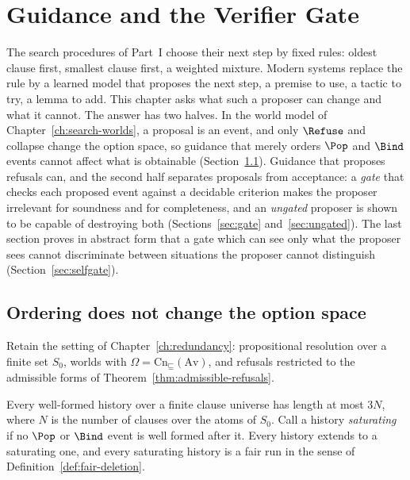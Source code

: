 \chapter{Guidance and the Verifier Gate}
\label{ch:guidance}

The search procedures of Part~I choose their next step by fixed rules: oldest clause first, smallest clause first, a weighted mixture. Modern systems replace the rule by a learned model that proposes the next step, a premise to use, a tactic to try, a lemma to add. This chapter asks what such a proposer can change and what it cannot. The answer has two halves. In the world model of Chapter~\ref{ch:search-worlds}, a proposal is an event, and only $\Refuse$ and collapse change the option space, so guidance that merely orders $\Pop$ and $\Bind$ events cannot affect what is obtainable (Section~\ref{sec:ordering}). Guidance that proposes refusals can, and the second half separates proposals from acceptance: a \emph{gate} that checks each proposed event against a decidable criterion makes the proposer irrelevant for soundness and for completeness, and an \emph{ungated} proposer is shown to be capable of destroying both (Sections~\ref{sec:gate} and~\ref{sec:ungated}). The last section proves in abstract form that a gate which can see only what the proposer sees cannot discriminate between situations the proposer cannot distinguish (Section~\ref{sec:selfgate}).

\section{Ordering does not change the option space}
\label{sec:ordering}

Retain the setting of Chapter~\ref{ch:redundancy}: propositional resolution over a finite set $S_0$, worlds with $\Omega=\mathrm{Cn}_{\sqsubseteq}(\mathrm{Av})$, and refusals restricted to the admissible forms of Theorem~\ref{thm:admissible-refusals}.

\begin{lemma}
\label{lem:maximal}
Every well-formed history over a finite clause universe has length at most $3N$, where $N$ is the number of clauses over the atoms of $S_0$. Call a history \emph{saturating} if no $\Pop$ or $\Bind$ event is well formed after it. Every history extends to a saturating one, and every saturating history is a fair run in the sense of Definition~\ref{def:fair-deletion}.
\end{lemma}

